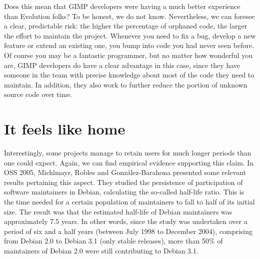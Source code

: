 Does this mean that GIMP developers were having a much better experience than
Evolution folks? To be honest, we do not know. Nevertheless, we can foresee a
clear, predictable risk: the higher the percentage of orphaned code, the larger
the effort to maintain the project. Whenever you need to fix a bug, develop a
new feature or extend an existing one, you bump into code you had never seen
before. Of course you may be a fantastic programmer, but no matter how wonderful
you are, GIMP developers do have a clear advantage in this case, since they have
someone in the team with precise knowledge about most of the code they need to
maintain. In addition, they also work to further reduce the portion of unknown
source code over time.

\section*{It feels like home}

Interestingly, some projects manage to retain users for much longer periods than
one could expect. Again, we can find empirical evidence supporting this claim.
In OSS 2005, Michlmayr, Robles and González-Barahona presented some relevant
results pertaining this aspect. They studied the persistence of participation of
software maintainers in Debian, calculating the so-called half-life ratio. This
is the time needed for a certain population of maintainers to fall to half of
its initial size. The result was that the estimated half-life of Debian
maintainers was approximately 7.5 years. In other words, since the study
was undertaken over a period of six and a half years (between July 1998 to
December 2004), comprising from Debian 2.0 to Debian 3.1 (only stable releases),
more than 50\% of maintainers of Debian 2.0 were still contributing to Debian
3.1.

